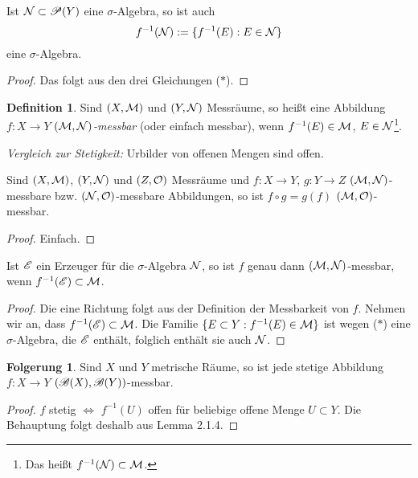 \documentclass[
 a4paper,
 12pt,
 parskip=half
 ]{scrreprt}
\theoremstyle{plain}
\theoremstyle{definition}
\newtheorem{defn}[thm]{Definition}
\newtheorem{folg}[thm]{Folgerung}
\numberwithin{equation}{section}
\begin{document}
\begin{lem}
 Ist $\mathcal{N} \subset \mathscr{P}(Y)$ eine $\sigma$-Algebra, so ist auch
 \[ f^{-1}(\mathcal{N}) := \{ f^{-1}(E) : E \in \mathcal{N} \} \]
 eine $\sigma$-Algebra.
\end{lem}

\begin{proof}
 Das folgt aus den drei Gleichungen ($\ast$).
\end{proof}

\begin{defn}
 Sind $(X,\mathcal{M})$ und $(Y,\mathcal{N})$ Messräume, so heißt eine Abbildung $f: X \to Y$ \emph{$(\mathcal{M},\mathcal{N})$-messbar} (oder einfach messbar), wenn $f^{-1}(E) \in \mathcal{M}$, $E \in \mathcal{N}$\footnote{Das heißt $f^{-1}(\mathcal{N}) \subset \mathcal{M}$.}.
 
 \emph{Vergleich zur Stetigkeit:} Urbilder von offenen Mengen sind offen.
\end{defn}

\begin{lem}
 Sind $(X,\mathcal{M})$, $(Y,\mathcal{N})$ und $(Z,\mathcal{O})$ Messräume und $f:X \to Y$, $g: Y \to Z$ $(\mathcal{M},\mathcal{N})$-messbare bzw. $(\mathcal{N},\mathcal{O})$-messbare Abbildungen, so ist $f \circ g = g(f)$ $(\mathcal{M},\mathcal{O})$-messbar.
\end{lem}

\begin{proof}
 Einfach.
\end{proof}

\clearpage

\begin{lem}
 Ist $\mathscr{E}$ ein Erzeuger für die $\sigma$-Algebra $\mathcal{N}$, so ist $f$ genau dann $(\mathcal{M},\mathcal{N})$-messbar, wenn $f^{-1}(\mathscr{E}) \subset \mathcal{M}$.
\end{lem}

\begin{proof}
 Die eine Richtung folgt aus der Definition der Messbarkeit von $f$. Nehmen wir an, dass $f^{-1}(\mathscr{E}) \subset \mathcal{M}$. Die Familie $\{ E \subset Y : f^{-1}(E) \in \mathcal{M} \}$ ist wegen ($\ast$) eine $\sigma$-Algebra, die $\mathscr{E}$ enthält, folglich enthält sie auch $\mathcal{N}$.
\end{proof}

\begin{folg}
 Sind $X$ und $Y$ metrische Räume, so ist jede stetige Abbildung $f: X \to Y$ $(\mathscr{B}(X),\mathscr{B}(Y))$-messbar.
\end{folg}

\begin{proof}
 $f$ stetig $\Leftrightarrow$ $f^{-1}(U)$ offen für beliebige offene Menge $U \subset Y$. Die Behauptung folgt deshalb aus Lemma 2.1.4.
\end{proof}
\end{document}
